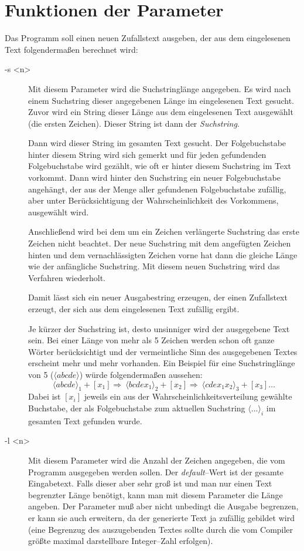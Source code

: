 \documentclass[paper=a4,notitlepage,parskip=half,plainheadsepline]{scrartcl}
\begin{document}
\section{Funktionen der Parameter}
Das Programm soll einen neuen Zufallstext ausgeben, der aus dem eingelesenen Text folgendermaßen berechnet wird:

\begin{description}
\item[-s <n>] Mit diesem Parameter wird die Suchstringlänge angegeben. Es wird nach einem Suchstring dieser angegebenen Länge im eingelesenen Text gesucht. Zuvor wird ein String dieser Länge aus dem eingelesenen Text ausgewählt (die ersten Zeichen). Dieser String ist dann der \emph{Suchstring}.

Dann wird dieser String im gesamten Text gesucht. Der Folgebuchstabe hinter diesem String wird sich gemerkt und für jeden gefundenden Folgebuchstabe wird gezählt, wie oft er hinter diesem Suchstring im Text vorkommt. Dann wird hinter den Suchstring ein neuer Folgebuchstabe angehängt, der aus der Menge aller gefundenen Folgebuchstabe zufällig, aber unter Berücksichtigung der Wahrscheinlichkeit des Vorkommens, ausgewählt wird. 

Anschließend wird bei dem um ein Zeichen verlängerte Suchstring das erste Zeichen nicht beachtet. Der neue Suchstring mit dem angefügten Zeichen hinten und dem vernachlässigten Zeichen vorne hat dann die gleiche Länge wie der anfängliche Suchstring. Mit diesem neuen Suchstring wird das Verfahren wiederholt.

Damit lässt sich ein neuer Ausgabestring erzeugen, der einen Zufallstext erzeugt, der sich aus dem eingelesenen Text zufällig ergibt.

Je kürzer der Suchstring ist, desto unsinniger wird der ausgegebene Text sein. Bei einer Länge von mehr als 5 Zeichen werden schon oft ganze Wörter berücksichtigt und der vermeintliche Sinn des ausgegebenen Textes erscheint mehr und mehr vorhanden.
Ein Beispiel für eine Suchstringlänge von 5 ($\langle abcde \rangle$) würde folgendermaßen aussehen: 
\begin{equation*}
\langle abcde \rangle_1 + [x_1]  \Rightarrow\ \langle bcdex_1 \rangle_2 + [x_{2}]  \Rightarrow\ \langle cdex_1x_2 \rangle_3 + [x_{3}] \ldots  
\end{equation*}
Dabei ist $[x_i]$ jeweils ein aus der Wahrscheinlichkeitsverteilung gewählte Buchstabe, der als Folgebuchstabe zum aktuellen Suchstring $\langle \ldots \rangle_i$ im gesamten Text gefunden wurde.
\item[-l <n>] Mit diesem Parameter wird die Anzahl der Zeichen angegeben, die vom Programm ausgegeben werden sollen. Der \emph{default}--Wert ist der gesamte Eingabetext. Falls dieser aber sehr groß ist und man nur einen Text begrenzter Länge benötigt, kann man mit diesem Parameter die Länge angeben. Der Parameter muß aber nicht unbedingt die Ausgabe begrenzen, er kann sie auch erweitern, da der generierte Text ja zufällig gebildet wird
(eine Begrenzug des auszugebenden Textes sollte durch die vom Compiler größte maximal darstellbare Integer--Zahl erfolgen).

\end{description}
\end{document}
